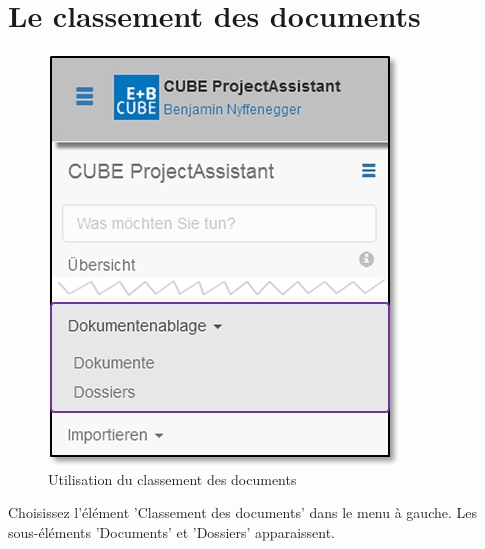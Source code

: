 
\clearpage
\section{Le classement des documents}
\label{bkm:Ref434830029}\label{bkm:Ref434828324}

\begin{figure}   %
  \vspace{-35pt}      %
  \begin{center}
    \includegraphics[width=1\linewidth]{../chapters/11_Dokumentenablage/pictures/11_Menu_Dokumentenablage.jpg}
  \end{center}
  \vspace{-20pt}
  \caption{Utilisation du classement des documents}
  \vspace{-10pt}
\end{figure}

Choisissez l'élément 'Classement des documents' dans le menu à gauche. Les sous-éléments 'Documents' et 'Dossiers' apparaissent.

